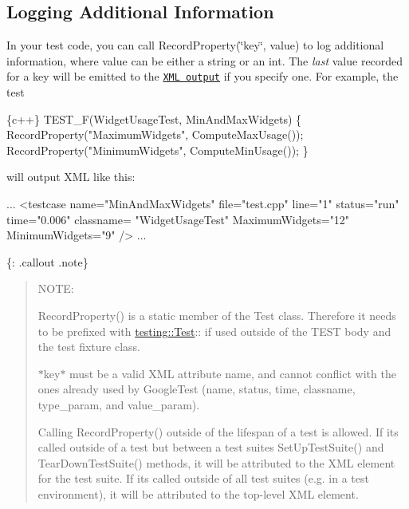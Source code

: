 \subsection*{Logging Additional Information}

In your test code, you can call {\ttfamily Record\+Property(\char`\"{}key\char`\"{}, value)} to log additional information, where {\ttfamily value} can be either a string or an {\ttfamily int}. The {\itshape last} value recorded for a key will be emitted to the \href{#generating-an-xml-report}{\tt X\+ML output} if you specify one. For example, the test


\begin{DoxyCode}
\{c++\}
TEST\_F(WidgetUsageTest, MinAndMaxWidgets) \{
  RecordProperty("MaximumWidgets", ComputeMaxUsage());
  RecordProperty("MinimumWidgets", ComputeMinUsage());
\}
\end{DoxyCode}


will output X\+ML like this\+:


\begin{DoxyCode}
...
  <\textcolor{keywordtype}{testcase} \textcolor{keyword}{name}=\textcolor{stringliteral}{"MinAndMaxWidgets"} \textcolor{keyword}{file}=\textcolor{stringliteral}{"test.cpp"} \textcolor{keyword}{line}=\textcolor{stringliteral}{"1"} \textcolor{keyword}{status}=\textcolor{stringliteral}{"run"} \textcolor{keyword}{time}=\textcolor{stringliteral}{"0.006"} \textcolor{keyword}{classname}=\textcolor{stringliteral}{
      "WidgetUsageTest"} \textcolor{keyword}{MaximumWidgets}=\textcolor{stringliteral}{"12"} \textcolor{keyword}{MinimumWidgets}=\textcolor{stringliteral}{"9"} />
...
\end{DoxyCode}


\{\+: .callout .note\} \begin{quote}
N\+O\+TE\+:


\begin{DoxyItemize}
\item {\ttfamily Record\+Property()} is a static member of the {\ttfamily Test} class. Therefore it needs to be prefixed with {\ttfamily \mbox{\hyperlink{classtesting_1_1Test}{testing\+::\+Test}}\+:\+:} if used outside of the {\ttfamily T\+E\+ST} body and the test fixture class.
\item $\ast${\ttfamily key}$\ast$ must be a valid X\+ML attribute name, and cannot conflict with the ones already used by Google\+Test ({\ttfamily name}, {\ttfamily status}, {\ttfamily time}, {\ttfamily classname}, {\ttfamily type\+\_\+param}, and {\ttfamily value\+\_\+param}).
\item Calling {\ttfamily Record\+Property()} outside of the lifespan of a test is allowed. If it\textquotesingle{}s called outside of a test but between a test suite\textquotesingle{}s {\ttfamily Set\+Up\+Test\+Suite()} and {\ttfamily Tear\+Down\+Test\+Suite()} methods, it will be attributed to the X\+ML element for the test suite. If it\textquotesingle{}s called outside of all test suites (e.\+g. in a test environment), it will be attributed to the top-\/level X\+ML element. 
\end{DoxyItemize}\end{quote}


